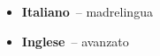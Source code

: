 \begin{itemize}
	\item \textbf{Italiano}~-- madrelingua \\
	\item \textbf{Inglese}~-- avanzato \\
\end{itemize} 